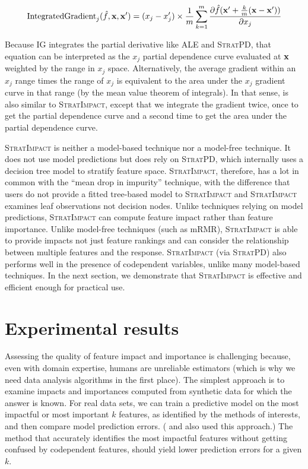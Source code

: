 \documentclass[11pt]{article}
\newcommand{\simp}{\fontfamily{cmr}\textsc{\small StratImpact}}
\newcommand{\spd}{\fontfamily{cmr}\textsc{\small StratPD}}
\begin{document}
\begin{equation}
\text{IntegratedGradient}_j(\hat{f}, {\bf x},{\bf x'}) = (x_j - x'_j) \times \frac{1}{m} \sum_{k=1}^{m} \frac{\partial \hat{f}({\bf x}' + \frac{k}{m}({\bf x}-{\bf x}'))}{\partial x_j}
\end{equation}

\noindent  Because IG integrates the partial derivative like ALE and \spd, that equation can be interpreted as the $x_j$ partial dependence curve evaluated at $\bf x$ weighted by the range in $x_j$ space. Alternatively, the average gradient within an $x_j$ range times the range of $x_j$ is equivalent to the area under the $x_j$ gradient curve in that range (by the mean value theorem of integrals). In that sense, \cite{intgrad} is also similar to \simp, except that we integrate the gradient twice, once to get the partial dependence curve and a second time to get the area under the partial dependence curve.

\simp{} is neither a model-based technique nor a model-free technique. It does not use model predictions but does rely on \spd, which internally uses a decision tree model to stratify feature space. \simp{}, therefore, has a lot in common with the ``mean drop in impurity'' technique, with the difference that users do not provide a fitted tree-based model to \simp{} and \simp{} examines leaf observations not decision nodes. Unlike techniques relying on model predictions, \simp{} can compute feature impact rather than feature importance. Unlike model-free techniques (such as mRMR), \simp{} is able to provide impacts not just feature rankings and can consider the relationship between multiple features and the response.   \simp{} (via \spd) also performs well in the presence of codependent variables, unlike many model-based techniques. In the next section, we demonstrate that \simp{} is effective and efficient enough for practical use.

\section{Experimental results}\label{sec:experiments}

Assessing the quality of feature impact and importance is challenging because, even with domain expertise, humans are unreliable estimators (which is why we need data analysis algorithms in the first place).  The simplest approach is to examine impacts and importances computed from synthetic data for which the answer is known.  For real data sets, we can train a predictive model on the most impactful or most important $k$ features, as identified by the methods of interests, and then compare model prediction errors. (\citealt{mRMR} and \citealt{tsanas} also used this approach.) The method that accurately identifies the most impactful features without getting confused by codependent features, should yield lower prediction errors for a given $k$.  
\end{document}
